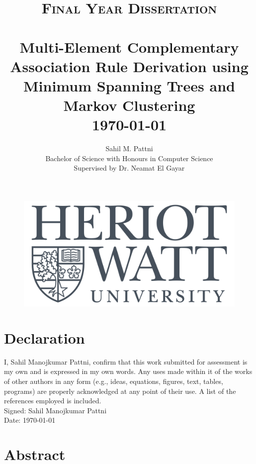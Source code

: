 \documentclass[paper=a4, fontsize=11pt]{article}	%
\title{	\normalsize \textsc{Final Year Dissertation} 	%
		 	\\[2.0cm]								%
			\HRule{0.5pt} \\						%
			\LARGE \textbf{{Multi-Element Complementary Association Rule Derivation using Minimum Spanning Trees and Markov Clustering}}	%
			\HRule{2pt} \\ [0.5cm]		%
			\normalsize \today			%
		}
\author{
		Sahil M. Pattni\\	
		Bachelor of Science with Honours in Computer Science\\
        Supervised by Dr. Neamat El Gayar \\
}
\makeatletter
\def\printtitle{%
    {\centering \@title\par}}
\def\printauthor{%
    {\centering \large \@author}}
\newcommand{\me}{Sahil Manojkumar Pattni}
\makeatother
\begin{document}
\thispagestyle{empty}		%

\begin{figure}[H]
\centering
\includegraphics[scale=0.22]{hw_logo.png}
\end{figure}

\printtitle					%
  	\vfill


\printauthor				%
\newpage




\setcounter{page}{1}		%

\section*{Declaration}
I, \me, confirm that this work submitted for assessment is my own and is expressed in my own words. Any uses made within it of the works of other authors in any form (e.g., ideas, equations, figures, text, tables, programs) are properly acknowledged at any point of their use. A list of the references employed is included.
\\Signed: \me
\\Date: \today

\section*{Abstract}




\end{document}
